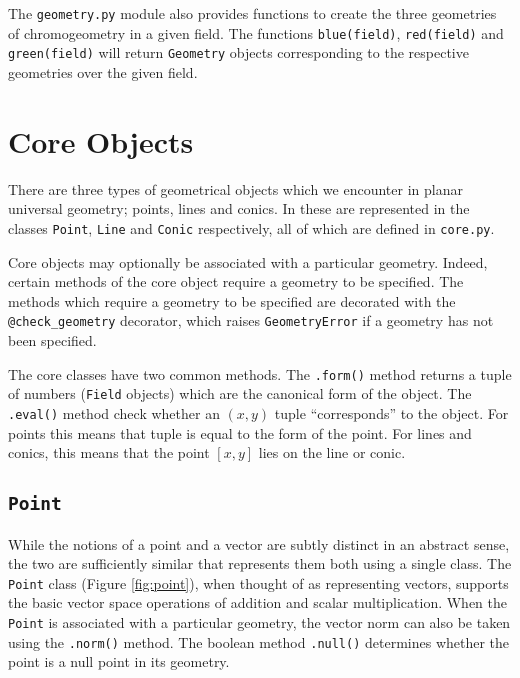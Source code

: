 The \texttt{geometry.py} module also provides functions to create the three geometries of chromogeometry in a given field.
The functions \texttt{blue(field)}, \texttt{red(field)} and \texttt{green(field)} will return \texttt{Geometry} objects corresponding to the respective geometries over the given field.

\section{Core Objects}

There are three types of geometrical objects which we encounter in planar universal geometry; points, lines and conics.
In \pygeom these are represented in the classes \texttt{Point}, \texttt{Line} and \texttt{Conic} respectively, all of which are defined in \texttt{core.py}.

Core objects may optionally be associated with a particular geometry.
Indeed, certain methods of the core object require a geometry to be specified.
The methods which require a geometry to be specified are decorated with the \texttt{@check\_geometry} decorator, which raises \texttt{GeometryError} if a geometry has not been specified.

The core classes have two common methods.
The \texttt{.form()} method returns a tuple of numbers (\texttt{Field} objects) which are the canonical form of the object.
The \texttt{.eval()} method check whether an $(x, y)$ tuple ``corresponds'' to the object.
For points this means that tuple is equal to the form of the point.
For lines and conics, this means that the point $[x, y]$ lies on the line or conic.

\subsection{\texttt{Point}}\label{sec:point}

While the notions of a point and a vector are subtly distinct in an abstract sense, the two are sufficiently similar that \pygeom represents them both using a single class.
The \texttt{Point} class (Figure \ref{fig:point}), when thought of as representing vectors, supports the basic vector space operations of addition and scalar multiplication.
When the \texttt{Point} is associated with a particular geometry, the vector norm can also be taken using the \texttt{.norm()} method.
The boolean method \texttt{.null()} determines whether the point is a null point in its geometry.

